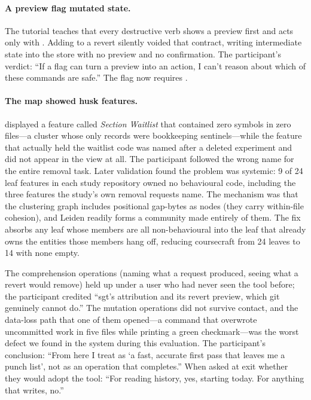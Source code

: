 \paragraph{A preview flag mutated state.}
The tutorial teaches that every destructive verb shows a preview first and acts
only with . Adding  to a revert silently
voided that contract, writing intermediate state into the store with no preview
and no confirmation. The participant's verdict: ``If a flag can turn a preview
into an action, I can't reason about which of these commands are safe.'' The
flag now requires .

\paragraph{The map showed husk features.}
 displayed a feature called \emph{Section Waitlist} that
contained zero symbols in zero files---a cluster whose only records were
bookkeeping sentinels---while the feature that actually held the waitlist
code was named after a deleted experiment and did not appear in the view at all.
The participant followed the wrong name for the entire removal task. Later
validation found the problem was systemic: 9 of 24 leaf features in each study
repository owned no behavioural code, including the three features the study's
own removal requests name. The mechanism was that the clustering graph includes
positional gap-bytes as nodes (they carry within-file cohesion), and Leiden
readily forms a community made entirely of them. The fix absorbs any leaf whose
members are all non-behavioural into the leaf that already owns the entities
those members hang off, reducing coursecraft from 24 leaves to 14 with none
empty.

\smallskip\noindent
The comprehension operations (naming what a request produced, seeing what a
revert would remove) held up under a user who had never seen the tool before;
the participant credited ``sgt's attribution and its revert preview, which git
genuinely cannot do.'' The mutation operations did not survive contact, and the
data-loss path that one of them opened---a  command that overwrote
uncommitted work in five files while printing a green checkmark---was the worst
defect we found in the system during this evaluation. The participant's
conclusion: ``From here I treat  as `a fast, accurate first
pass that leaves me a punch list', not as an operation that completes.'' When
asked at exit whether they would adopt the tool: ``For reading history, yes,
starting today. For anything that writes, no.''

